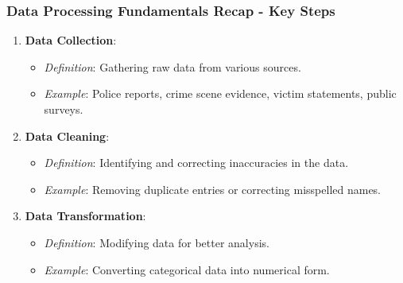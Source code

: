 \documentclass[aspectratio=169]{beamer}
\begin{document}
\begin{frame}[fragile]
    \frametitle{Data Processing Fundamentals Recap - Key Steps}
    \begin{enumerate}
        \item \textbf{Data Collection}:
        \begin{itemize}
            \item \textit{Definition}: Gathering raw data from various sources.
            \item \textit{Example}: Police reports, crime scene evidence, victim statements, public surveys.
        \end{itemize}
        
        \item \textbf{Data Cleaning}:
        \begin{itemize}
            \item \textit{Definition}: Identifying and correcting inaccuracies in the data.
            \item \textit{Example}: Removing duplicate entries or correcting misspelled names.
        \end{itemize}
        
        \item \textbf{Data Transformation}:
        \begin{itemize}
            \item \textit{Definition}: Modifying data for better analysis.
            \item \textit{Example}: Converting categorical data into numerical form.
        \end{itemize}
    \end{enumerate}
\end{frame}
\end{document}
